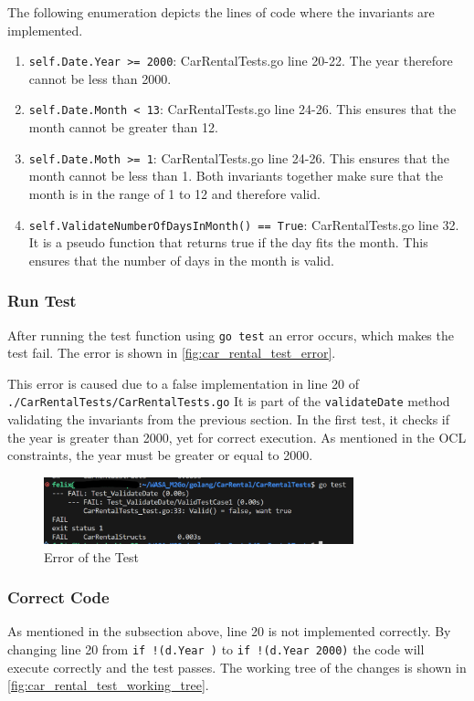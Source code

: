 The following enumeration depicts the lines of code where the invariants are implemented.
\begin{enumerate}
    \item \texttt{self.Date.Year >= 2000}: CarRentalTests.go line 20-22.
    The year therefore cannot be less than 2000.
    \item \texttt{self.Date.Month < 13}: CarRentalTests.go line 24-26.
    This ensures that the month cannot be greater than 12.
    \item \texttt{self.Date.Moth >= 1}: CarRentalTests.go line 24-26.
    This ensures that the month cannot be less than 1.
    Both invariants together make sure that the month is in the range of 1 to 12 and therefore valid.
    \item \texttt{self.ValidateNumberOfDaysInMonth() == True}: CarRentalTests.go line 32.
    It is a pseudo function that returns true if the day fits the month.
    This ensures that the number of days in the month is valid.
\end{enumerate}

\subsubsection*{Run Test}
After running the test function using \texttt{go test} an error occurs, which makes the test fail.
The error is shown in \autoref{fig:car_rental_test_error}.

This error is caused due to a false implementation in line 20 of \hfill \linebreak \texttt{./CarRentalTests/CarRentalTests.go}
It is part of the \texttt{validateDate} method validating the invariants from the previous section.
In the first test, it checks if the year is greater than 2000, yet for correct execution.
As mentioned in the OCL constraints, the year must be greater or equal to 2000.

\begin{figure}[H]
    \centering
    \includegraphics[width=0.8\textwidth]{figures/goLang/carRental/carRental_dateTestError.png}
    \caption{Error of the Test}
    \label{fig:car_rental_test_error}
\end{figure}

\subsubsection*{Correct Code}
As mentioned in the subsection above, line 20 is not implemented correctly.
By changing line 20 from \texttt{if !(d.Year )} to \texttt{if !(d.Year \>\= 2000)} the code will execute correctly and the test passes.
The working tree of the changes is shown in \autoref{fig:car_rental_test_working_tree}.

